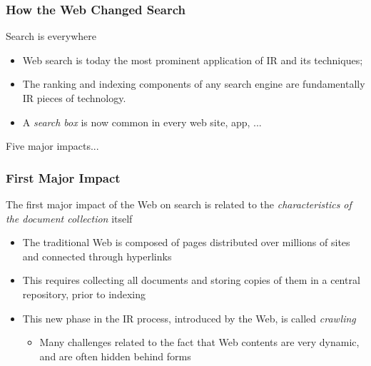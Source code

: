 \documentclass[svgnames]{beamer}
\begin{document}
\begin{frame}
    \frametitle{How the Web Changed Search}

    \begin{block}{Search is everywhere}

        \begin{itemize}
        \item Web search is today the most prominent application of IR and its
            techniques;
        \item The ranking and indexing components of any search engine are fundamentally IR pieces of technology. 

        \item A \emph{search box} is now common in every web site, app, ...

        \end{itemize}
    \end{block}

    \begin{block}{}
        Five major impacts...
    \end{block}


\end{frame}


\begin{frame}
    \frametitle{First Major Impact}

    The first major impact of the Web on search is related to the \emph{characteristics of the document collection} itself

    \begin{itemize}
    \item The traditional Web is composed of pages distributed over millions of sites and connected through hyperlinks
    \item This requires collecting all documents and storing copies of them in a central repository, prior to indexing
    \item This new phase in the IR process, introduced by the Web, is
        called \emph{crawling}
        \begin{itemize}
        \item Many challenges related to the fact that Web contents are very dynamic, and are often hidden behind forms
        \end{itemize}
    \end{itemize}

\end{frame}
\end{document}
